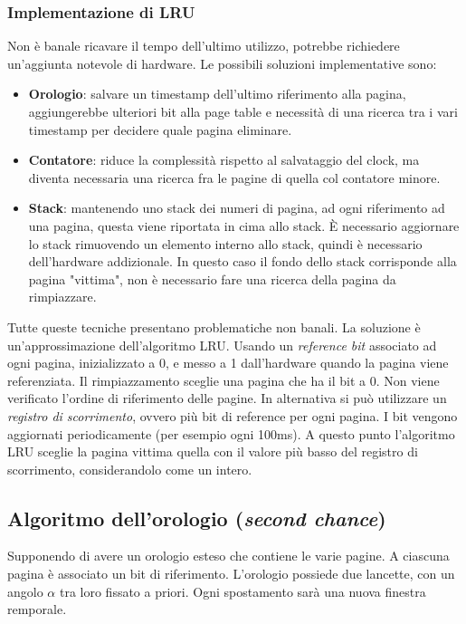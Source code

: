 \documentclass[a4paper,12pt, twoside]{report}
\begin{document}
\subsubsection{Implementazione di LRU}
Non \`e banale ricavare il tempo dell'ultimo utilizzo, potrebbe richiedere un'aggiunta notevole di hardware. 
Le possibili soluzioni implementative sono: 
\begin{itemize}
    \item \textbf{Orologio}: salvare un timestamp dell'ultimo riferimento alla pagina, aggiungerebbe ulteriori bit alla 
        page table e necessit\`a di una ricerca tra i vari timestamp per decidere quale pagina eliminare. 
    \item \textbf{Contatore}: riduce la complessit\`a rispetto al salvataggio del clock, ma diventa necessaria una 
        ricerca fra le pagine di quella col contatore minore. 
    \item \textbf{Stack}: mantenendo uno stack dei numeri di pagina, ad ogni riferimento ad una pagina, questa viene 
        riportata in cima allo stack. \`E necessario aggiornare lo stack rimuovendo un elemento interno allo stack, quindi 
        \`e necessario dell'hardware addizionale. In questo caso il fondo dello stack corrisponde alla pagina "vittima", 
        non \`e necessario fare una ricerca della pagina da rimpiazzare. 
\end{itemize}
Tutte queste tecniche presentano problematiche non banali. La soluzione \`e un'approssimazione dell'algoritmo LRU. 
Usando un \emph{reference bit} associato ad ogni pagina, inizializzato a 0, e messo a 1 dall'hardware quando la pagina 
viene referenziata. Il rimpiazzamento sceglie una pagina che ha il bit a 0. Non viene verificato l'ordine di riferimento 
delle pagine. In alternativa si pu\`o utilizzare un \emph{registro di scorrimento}, ovvero pi\`u bit di reference per ogni 
pagina. I bit vengono aggiornati periodicamente (per esempio ogni 100ms). A questo punto l'algoritmo LRU sceglie la pagina 
vittima quella con il valore pi\`u basso del registro di scorrimento, considerandolo come un intero. 

\subsection{Algoritmo dell'orologio (\emph{second chance})}

Supponendo di avere un orologio esteso che contiene le varie pagine. A ciascuna pagina \`e associato un bit di riferimento. 
L'orologio possiede due lancette, con un angolo $\alpha$ tra loro fissato a priori. 
Ogni spostamento sar\`a una nuova finestra remporale. 
\end{document}
